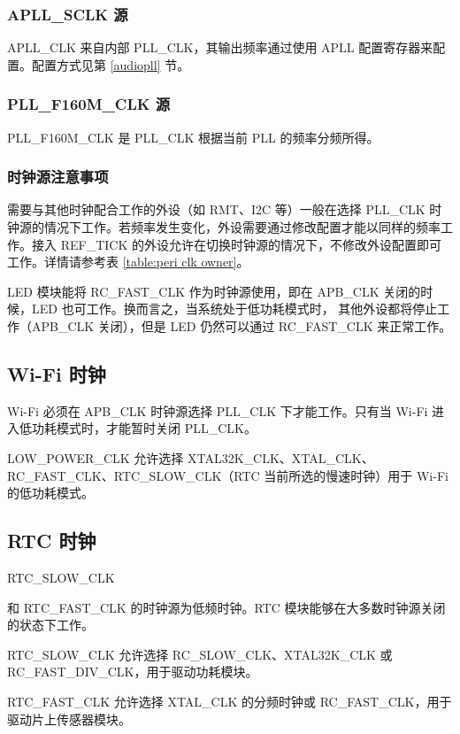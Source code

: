 \documentclass[main\_\_CN.tex]{subfiles}
\begin{document}
\subsubsection{APLL\_SCLK 源}

APLL\_CLK 来自内部 PLL\_CLK，其输出频率通过使用 APLL 配置寄存器来配置。配置方式见第 \ref{audiopll} 节。

\subsubsection{PLL\_F160M\_CLK 源}

PLL\_F160M\_CLK 是 PLL\_CLK 根据当前 PLL 的频率分频所得。


\subsubsection{时钟源注意事项}

需要与其他时钟配合工作的外设（如 RMT、I2C 等）一般在选择 PLL\_CLK 时钟源的情况下工作。若频率发生变化，外设需要通过修改配置才能以同样的频率工作。接入 REF\_TICK 的外设允许在切换时钟源的情况下，不修改外设配置即可工作。详情请参考表 \ref{table:peri clk owner}。

LED 模块能将 RC\_FAST\_CLK 作为时钟源使用，即在 APB\_CLK 关闭的时候，LED 也可工作。换而言之，当系统处于低功耗模式时，
其他外设都将停止工作（APB\_CLK 关闭），但是 LED 仍然可以通过 RC\_FAST\_CLK 来正常工作。



\subsection{Wi-Fi 时钟}
Wi-Fi 必须在 APB\_CLK 时钟源选择 PLL\_CLK 下才能工作。只有当 Wi-Fi 进入低功耗模式时，才能暂时关闭 PLL\_CLK。

LOW\_POWER\_CLK 允许选择 XTAL32K\_CLK、XTAL\_CLK、RC\_FAST\_CLK、RTC\_SLOW\_CLK（RTC 当前所选的慢速时钟）用于 Wi-Fi 的低功耗模式。


\subsection{RTC 时钟}

\hypertarget{SLOW_CLK}{RTC\_SLOW\_CLK} 和 RTC\_FAST\_CLK 的时钟源为低频时钟。RTC 模块能够在大多数时钟源关闭的状态下工作。


RTC\_SLOW\_CLK 允许选择 RC\_SLOW\_CLK、XTAL32K\_CLK 或 RC\_FAST\_DIV\_CLK，用于驱动功耗模块。

RTC\_FAST\_CLK 允许选择 XTAL\_CLK 的分频时钟或 RC\_FAST\_CLK，用于驱动片上传感器模块。
\end{document}
